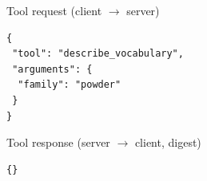 \begin{mcpbox}{Tool request (client $\rightarrow$ server)}
\begin{lstlisting}[style=jsonstyle]
{
 "tool": "describe_vocabulary",
 "arguments": {
  "family": "powder"
 }
}
\end{lstlisting}
\end{mcpbox}
\begin{mcpbox}{Tool response (server $\rightarrow$ client, digest)}
\begin{lstlisting}[style=jsonstyle]
{}
\end{lstlisting}
\end{mcpbox}